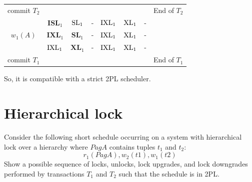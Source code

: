 \documentclass[12pt, a4paper]{report}
\newtheorem[style=M,bodystyle=\normalfont]{theorem}{Theorem}
\newtheorem[style=M,bodystyle=\normalfont]{corollary}{Corollary}
\newtheorem[style=M,bodystyle=\normalfont]{lemma}{Lemma}
\newtheorem[style=M,bodystyle=\normalfont]{definition}{Definition}
\begin{document}
\begin{table}[H]
\begin{tabular}{c|cccccc|c}
            \multicolumn{1}{|c|}{commit $T_2$} &                          &                         &            &                          &                     &                     & End of $T_2$ \\
            \multicolumn{1}{|c|}{}             & $\textbf{ISL}_1$         & $\textnormal{SL}_1$     & -          & $\textnormal{IXL}_1$     & $\textnormal{XL}_1$ & -                   &              \\
            \multicolumn{1}{|c|}{$w_1(A)$}     & $\textbf{IXL}_1$         & $\textbf{SL}_1$         & -          & $\textnormal{IXL}_1$     & $\textnormal{XL}_1$ & -                   &              \\
            \multicolumn{1}{|c|}{}             & $\textnormal{IXL}_1$     & $\textbf{XL}_1$         & -          & $\textnormal{IXL}_1$     & $\textnormal{XL}_1$ & -                   &              \\
            \multicolumn{1}{|c|}{commit $T_1$} &                          &                         &            &                          &                     &                     & End of $T_1$ \\ \cline{1-7}
            \end{tabular}
        \end{table}
        So, it is compatible with a strict 2PL scheduler. 

    \newpage

    \section{Hierarchical lock}
        Consider the following short schedule occurring on a system with hierarchical lock over a hierarchy where $PagA$ contains tuples 
        $t_1$ and $t_2$:
        \[r_1( PagA ), w_2( t1 ), w_1( t2 )\]
        Show a possible sequence of locks, unlocks, lock upgrades, and lock downgrades performed by transactions $T_1$ and $T_2$ such that
        the schedule is in 2PL.
\end{document}

